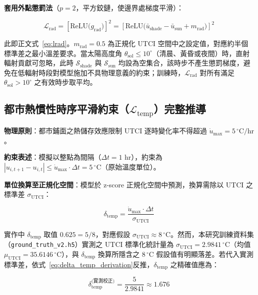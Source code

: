 \noindent\textbf{套用外點懲罰法}（$p=2$，平方鉸鏈，使邊界處梯度平滑）：

\begin{equation}
    \mathcal{L}_{\text{rad}} = \left[\text{ReLU}\big(g_{\text{rad}}\big)\right]^2
    = \left[\text{ReLU}\big(\bar{u}_{\text{shade}} - \bar{u}_{\text{sun}} + m_{\text{rad}}\big)\right]^2
\end{equation}

此即正文式~\eqref{eq:lrad}。$m_{\text{rad}} = 0.5$ 為正規化 UTCI 空間中之設定值，對應約半個標準差之最小溫差要求。當太陽高度角 $\theta_{\text{sol}} \le 10^\circ$（清晨、黃昏或夜間）時，直射輻射貢獻可忽略，此時 $\mathcal{S}_{\text{shade}}$ 與 $\mathcal{S}_{\text{sun}}$ 均設為空集合，該時步不產生懲罰梯度，避免在低輻射時段對模型施加不具物理意義的約束；訓練時，$\mathcal{L}_{\text{rad}}$ 對所有滿足 $\theta_{\text{sol}}>10^\circ$ 之有效時步取平均。

\subsection{都市熱慣性時序平滑約束（$\mathcal{L}_{\text{temp}}$）完整推導}

\noindent\textbf{物理原則}：都市鋪面之熱儲存效應限制 UTCI 逐時變化率不得超過 $\dot{u}_{\text{max}} = 5\,^\circ\text{C/hr}$。

\noindent\textbf{約束表述}：模擬以整點為間隔（$\Delta t = 1$ hr），約束為 $|u_{i,t+1} - u_{i,t}| \le \dot{u}_{\text{max}} \cdot \Delta t = 5\,^\circ\text{C}$（原始溫度單位）。

\noindent\textbf{單位換算至正規化空間}：模型於 z-score 正規化空間中預測，換算需除以 UTCI 之標準差 $\sigma_{\text{UTCI}}$：

\begin{equation}
    \delta_{\text{temp}} = \frac{\dot{u}_{\text{max}} \cdot \Delta t}{\sigma_{\text{UTCI}}}
    \label{eq:delta_temp_derivation}
\end{equation}

實作中 $\delta_{\text{temp}}$ 取值 $0.625 = 5/8$，對應假設 $\sigma_{\text{UTCI}} \approx 8\,^\circ\text{C}$。然而，本研究訓練資料集（\texttt{ground\_truth\_v2.h5}）實測之 UTCI 標準化統計量為 $\sigma_{\text{UTCI}} = 2.9841\,^\circ\text{C}$（均值 $\mu_{\text{UTCI}} = 35.6146\,^\circ\text{C}$），與 $\delta_{\text{temp}}$ 換算所隱含之 $8\,^\circ\text{C}$ 假設值有明顯落差。若代入實測標準差，依式~\eqref{eq:delta_temp_derivation}反推，$\delta_{\text{temp}}$ 之精確值應為：

\begin{equation}
    \delta_{\text{temp}}^{\text{(實測校正)}} = \frac{5}{2.9841} \approx 1.676
\end{equation}

